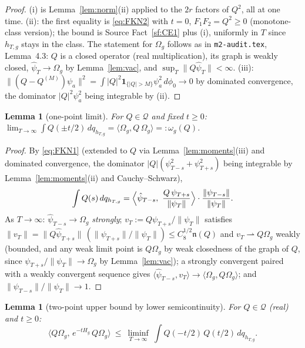 \documentclass[11pt,a4paper]{article}
\theoremstyle{plain}
\newtheorem{lemma}[theorem]{Lemma}
\theoremstyle{definition}
\newcommand{\Om}{\Omega}
\newcommand{\Q}{\mathcal{Q}}
\newcommand{\ip}[2]{\langle #1,#2\rangle}
\begin{document}
\begin{proof}
(i) is Lemma~\ref{lem:norm}(ii) applied to the $2r$ factors of $Q^2$, all at one time.
(ii): the first equality is \eqref{eq:FKN2} with $t=0$, $F_1F_2=Q^2\ge0$ (monotone-class version);
the bound is Source Fact~\ref{sf:CE1} plus (i), uniformly in $T$ since $h_{T,g}$ stays in the
class. The statement for $\Om_g$ follows as in \texttt{m2-audit.tex}, Lemma~4.3: $Q$ is a closed
operator (real multiplication), its graph is weakly closed, $\hat\psi_T\to\Om_g$ by
Lemma~\ref{lem:vac}, and $\sup_T\|Q\hat\psi_T\|<\infty$.
(iii): $\|(Q-Q^{(M)})\psi_a\|^2=\int|Q|^2\mathbf 1_{\{|Q|>M\}}\psi_a^2\,d\phi_0\to0$ by dominated
convergence, the dominator $|Q|^2\psi_a^2$ being integrable by (ii).
\end{proof}

\begin{lemma}[one-point limit]\label{lem:onepoint}
For $Q\in\Q$ and fixed $t\ge0$:
$\displaystyle\lim_{T\to\infty}\int Q(\pm t/2)\,dq_{h_{T,g}}=\ip{\Om_g}{Q\,\Om_g}=:\omega_g(Q)$.
\end{lemma}

\begin{proof}
By \eqref{eq:FKN1} (extended to $Q$ via Lemma~\ref{lem:moments}(iii) and dominated convergence,
the dominator $|Q|(\psi_{T-s}^2+\psi_{T+s}^2)$ being integrable by Lemma~\ref{lem:moments}(ii) and
Cauchy--Schwarz),
\[
  \int Q(s)\,dq_{h_{T,g}}
  =\Bigl\langle\hat\psi_{T-s},\ \frac{Q\,\psi_{T+s}}{\|\psi_T\|}\Bigr\rangle
  \cdot\frac{\|\psi_{T-s}\|}{\|\psi_T\|}.
\]
As $T\to\infty$: $\hat\psi_{T-s}\to\Om_g$ \emph{strongly}; $v_T:=Q\psi_{T+s}/\|\psi_T\|$ satisfies
$\|v_T\|=\|Q\hat\psi_{T+s}\|\,(\|\psi_{T+s}\|/\|\psi_T\|)\le C_8^{1/2}\mathfrak n(Q)$ and
$v_T\rightharpoonup Q\Om_g$ weakly (bounded, and any weak limit point is $Q\Om_g$ by weak
closedness of the graph of $Q$, since $\psi_{T+s}/\|\psi_T\|\to\Om_g$ by Lemma~\ref{lem:vac});
a strongly convergent paired with a weakly convergent sequence gives
$\ip{\hat\psi_{T-s}}{v_T}\to\ip{\Om_g}{Q\Om_g}$; and $\|\psi_{T-s}\|/\|\psi_T\|\to1$.
\end{proof}

\begin{lemma}[two-point upper bound by lower semicontinuity]\label{lem:lsc}
For $Q\in\Q$ (real) and $t\ge0$:
\[
  \ip{Q\Om_g}{\,e^{-tH_g}\,Q\Om_g}\ \le\ \liminf_{T\to\infty}\
  \int Q(-t/2)\,Q(t/2)\,dq_{h_{T,g}} .
\]
\end{lemma}
\end{document}
